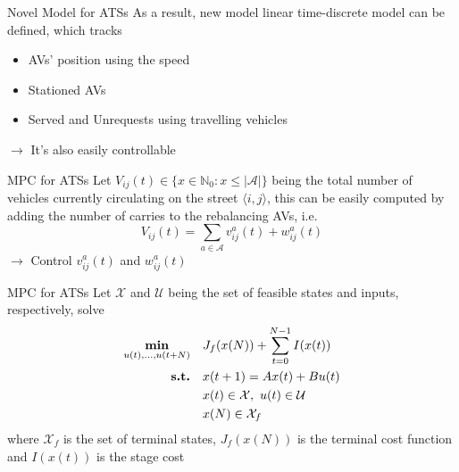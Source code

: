 \begin{frame}{Novel Model for ATSs}
	As a result, new model linear time-discrete model can be defined, which tracks
	\begin{itemize}
		\item AVs' position using the speed 
		\item Stationed AVs
		\item Served and Unrequests using travelling vehicles
	\end{itemize}
	\vspace{0.3cm}
	$\rightarrow$ It's also easily controllable
\end{frame}

\begin{frame}{MPC for ATSs}
	Let $V_{ij}(t) \in \{ x \in \mathbb{N}_0 : x \leq |\mathcal{A}|\}$ being the total number of vehicles currently circulating on the street $\langle i,j\rangle$, this can be easily computed by adding the number of carries to the rebalancing AVs, i.e. \\
	\begin{equation*}
		V_{ij}(t) = \sum_{a \in \mathcal{A}} v^{a}_{ij}(t) +w^{a}_{ij}(t)
	\end{equation*}
	$\rightarrow$ Control  $v^{a}_{ij}(t)$ and $w^{a}_{ij}(t)$
\end{frame}
\begin{frame}{MPC for ATSs}
	Let $\mathcal{X}$ and $\mathcal{U}$ being the set of feasible states and inputs, respectively, solve
	\begin{equation}
		\begin{aligned}
			\underset{\substack{u(t), \dots, u(t+N)}}{\text{\textbf{min}}} \quad & J_f(x(N))+\sum_{t=0}^{N-1}I(x(t)) \\
			\text{\textbf{s.t.}} \quad & x(t+1) = Ax(t) + Bu(t)  \\
			& x(t) \in \mathcal{X}, \ u(t)\in \mathcal{U} \\
			&x(N) \in \mathcal{X}_f\\
		\end{aligned}
	\end{equation}
	where $\mathcal{X}_f$ is the set of terminal states, $J_f(x(N))$ is the terminal cost function and $I(x(t))$ is the stage cost
\end{frame}
